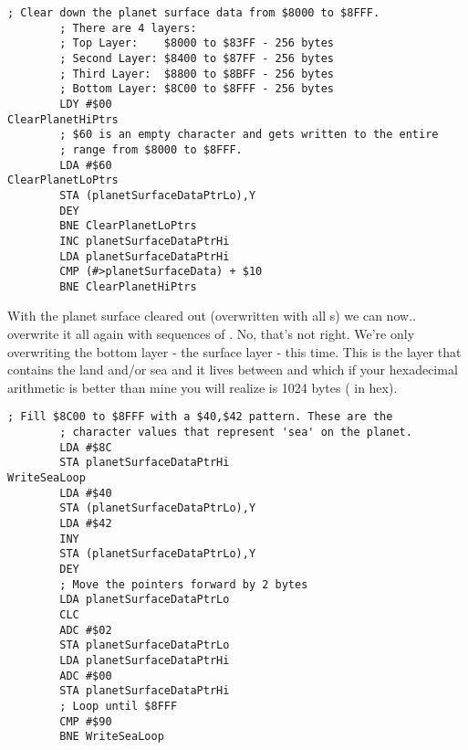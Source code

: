 \begin{lstlisting}[caption=The surface data is stored from \icode{\$8000} to \icode{\$8FFF}. This code overwrites it all with 
the value \$60\, which is an empty bitmap.]
        ; Clear down the planet surface data from $8000 to $8FFF.
        ; There are 4 layers:
        ; Top Layer:    $8000 to $83FF - 256 bytes 
        ; Second Layer: $8400 to $87FF - 256 bytes 
        ; Third Layer:  $8800 to $8BFF - 256 bytes 
        ; Bottom Layer: $8C00 to $8FFF - 256 bytes 
        LDY #$00
ClearPlanetHiPtrs   
        ; $60 is an empty character and gets written to the entire
        ; range from $8000 to $8FFF.
        LDA #$60
ClearPlanetLoPtrs   
        STA (planetSurfaceDataPtrLo),Y
        DEY
        BNE ClearPlanetLoPtrs
        INC planetSurfaceDataPtrHi
        LDA planetSurfaceDataPtrHi
        CMP (#>planetSurfaceData) + $10
        BNE ClearPlanetHiPtrs
\end{lstlisting}

%


With the planet surface cleared out (overwritten with all s) we can now.. overwrite it all again with sequences of
. No, that's not right. We're only overwriting the bottom layer - the surface layer - this time. This is the
layer that contains the land and/or sea and it lives between  and  which if your hexadecimal
arithmetic is better than mine you will realize is 1024 bytes ( in hex).

\begin{lstlisting}[caption=Filling the entire bottom surface of the planet with \icode{\$40,\$42}\, which gives us the sea. Our next step is
to overwrite some of this with land.]
        ; Fill $8C00 to $8FFF with a $40,$42 pattern. These are the
        ; character values that represent 'sea' on the planet.
        LDA #$8C
        STA planetSurfaceDataPtrHi
WriteSeaLoop   
        LDA #$40
        STA (planetSurfaceDataPtrLo),Y
        LDA #$42
        INY
        STA (planetSurfaceDataPtrLo),Y
        DEY
        ; Move the pointers forward by 2 bytes
        LDA planetSurfaceDataPtrLo
        CLC
        ADC #$02
        STA planetSurfaceDataPtrLo
        LDA planetSurfaceDataPtrHi
        ADC #$00
        STA planetSurfaceDataPtrHi
        ; Loop until $8FFF
        CMP #$90
        BNE WriteSeaLoop
\end{lstlisting}

